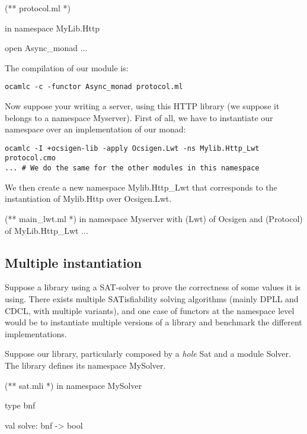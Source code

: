 \medskip

\begin{OCaml}
(** protocol.ml *)

in namespace MyLib.Http

open Async_monad
...
\end{OCaml}

The compilation of our module is:

\begin{verbatim}
ocamlc -c -functor Async_monad protocol.ml
\end{verbatim}

\medskip

Now suppose your writing a server, using this HTTP library (we suppose it
belongs to a namespace Myserver). First of all, we have to instantiate our
namespace over an implementation of our monad:

\begin{verbatim}
ocamlc -I +ocsigen-lib -apply Ocsigen.Lwt -ns Mylib.Http_Lwt protocol.cmo
... # We do the same for the other modules in this namespace 
\end{verbatim}

We then create a new namespace Mylib.Http\_Lwt that corresponds to the
instantiation of Mylib.Http over Ocsigen.Lwt.

\begin{OCaml}
(** main_lwt.ml *)
in namespace Myserver
  with (Lwt) of Ocsigen
  and (Protocol) of MyLib.Http_Lwt
...
\end{OCaml}

\subsection{Multiple instantiation}

Suppose a library using a SAT-solver to prove the correctness of some values it
is using. There exists multiple SATisfiability solving algorithms (mainly DPLL
and CDCL, with multiple variants), and one case of functors at the namespace
level would be to instantiate multiple versions of a library and benchmark the
different implementations.

Suppose our library, particularly composed by a \emph{hole} Sat and a module
Solver. The library defines its namespace MySolver.

\begin{OCaml}
(** sat.mli *)
in namespace MySolver

type bnf

val solve: bnf -> bool
\end{OCaml}

